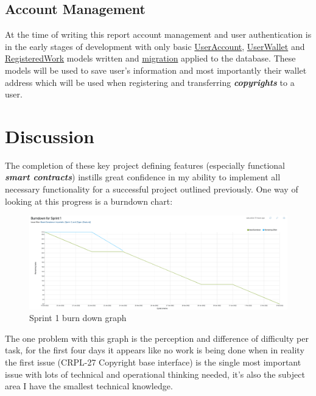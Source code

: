 \documentclass[12pt]{article}
\newcommand{\keyword}[1]{\textbf{\textit{#1}}}
\begin{document}
\subsection{Account Management}

At the time of writing this report account management and user authentication is in the early stages of development with only basic \href{https://github.com/MrHarrisonBarker/CRPL/blob/main/CRPL.Data/Account/UserAccount.cs}{UserAccount}, \href{https://github.com/MrHarrisonBarker/CRPL/blob/main/CRPL.Data/Account/UserWallet.cs}{UserWallet} and \href{https://github.com/MrHarrisonBarker/CRPL/blob/main/CRPL.Data/RegisteredWork.cs}{RegisteredWork} models written and \href{https://github.com/MrHarrisonBarker/CRPL/blob/main/CRPL.Web/Migrations/Application/20220123215316_UserAccountsAndWallets.cs}{migration} applied to the database. These models will be used to save user's information and most importantly their wallet address which will be used when registering and transferring \keyword{copyrights} to a user.

\section{Discussion}

The completion of these key project defining features (especially functional \keyword{smart contracts}) instills great confidence in my ability to implement all necessary functionality for a successful project outlined previously. One way of looking at this progress is a burndown chart:

\begin{figure}
	\caption{Sprint 1 burn down graph}
	\includegraphics[width=1\textwidth]{images/sprint-1-Burn}
\end{figure}

The one problem with this graph is the perception and difference of difficulty per task, for the first four days it appears like no work is being done when in reality the first issue (CRPL-27 Copyright base interface) is the single most important issue with lots of technical and operational thinking needed, it's also the subject area I have the smallest technical knowledge.
\end{document}
